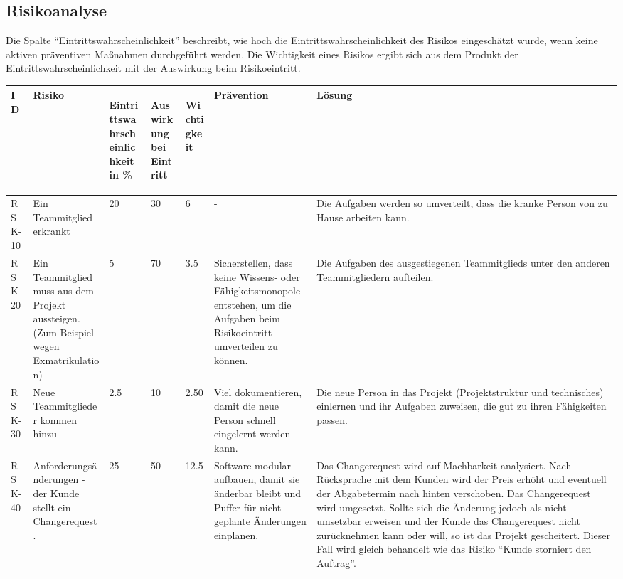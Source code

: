\begin{landscape}
\chapter{Risikoanalyse}
	Die Spalte \enquote{Eintrittswahrscheinlichkeit} beschreibt, wie hoch die Eintrittswahrscheinlichkeit des Risikos eingeschätzt wurde, wenn keine aktiven präventiven Maßnahmen durchgeführt werden.
	Die Wichtigkeit eines Risikos ergibt sich aus dem Produkt der Eintrittswahrscheinlichkeit mit der Auswirkung beim Risikoeintritt.
	\begin{longtable}{|p{1.5cm}|p{4.5cm}|p{0.4cm}|p{0.4cm}|p{0.8cm}|p{4.5cm}|p{4.5cm}|}

		\hline
		\textbf{ID}
			& \textbf{Risiko} 
				& \begin{turn}{90}\textbf{Eintrittswahrscheinlichkeit in \%}\end{turn}
					& \begin{turn}{90}\textbf{Auswirkung bei Eintritt}\end{turn}
						& \begin{turn}{90}\textbf{Wichtigkeit}\end{turn} 
							& \textbf{Prävention} 
								& \textbf{Lösung} 
		\\ \hline

		RSK-10 	& Ein Teammitglied erkrankt
				& 20 	& 30 	& 6 	& - 	& Die Aufgaben werden so umverteilt, dass die kranke Person von zu Hause arbeiten kann. 

		\\ \hline

		RSK-20 	& Ein Teammitglied muss aus dem Projekt aussteigen. (Zum Beispiel wegen Exmatrikulation)
				& 5 	& 70 	& 3.5 	& Sicherstellen, dass keine Wissens- oder Fähigkeitsmonopole entstehen, um die Aufgaben beim Risikoeintritt umverteilen zu können.
								& Die Aufgaben des ausgestiegenen Teammitglieds unter den anderen Teammitgliedern aufteilen.

		\\ \hline

		RSK-30 	& Neue Teammitglieder kommen hinzu
				& 2.5 	& 10 	& 2.50 	& Viel dokumentieren, damit die neue Person schnell eingelernt werden kann.
								& Die neue Person in das Projekt (Projektstruktur und technisches) einlernen und ihr Aufgaben zuweisen, die gut zu ihren Fähigkeiten passen.

		\\ \hline

		RSK-40 	& Anforderungsänderungen - der Kunde stellt ein Changerequest.
				& 25 	& 50 	& 12.5	& Software modular aufbauen, damit sie änderbar bleibt und Puffer für nicht geplante Änderungen einplanen.
								& Das Changerequest wird auf Machbarkeit analysiert. Nach Rücksprache mit dem Kunden wird der Preis erhöht und eventuell der Abgabetermin nach hinten verschoben. Das Changerequest wird umgesetzt. Sollte sich die Änderung jedoch als nicht umsetzbar erweisen und der Kunde das Changerequest nicht zurücknehmen kann oder will, so ist das Projekt gescheitert. Dieser Fall wird gleich behandelt wie das Risiko \enquote{Kunde storniert den Auftrag}.


\end{longtable}
\end{landscape}
